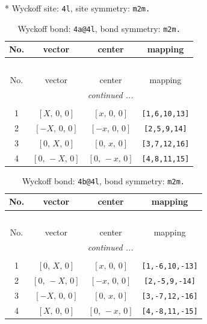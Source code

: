 \documentclass[fleqn,8pt]{jsarticle}
\begin{document}
* Wyckoff site: {\tt 4l}, site symmetry: {\tt m2m.}
\renewcommand{\arraystretch}{1.2}
\begin{longtable}{cccc}
\caption{Wyckoff bond: {\tt 4a@4l}, bond symmetry: {\tt m2m.}}
 \\
 \hline \hline
No. & vector & center & mapping \\ \hline \endfirsthead

\multicolumn{3}{l}{\tablename\ \thetable{}} \\
 \hline \hline
No. & vector & center & mapping \\ \hline \endhead

 \hline \hline
\multicolumn{3}{r}{\footnotesize\it continued ...} \\ \endfoot

 \hline \hline
\multicolumn{3}{r}{} \\ \endlastfoot

1 & $\left[ X,\, 0,\, 0 \right]$ & $\left[ x,\, 0,\, 0 \right]$ & {\tt [1,6,10,13]} \\ \hline
2 & $\left[ - X,\, 0,\, 0 \right]$ & $\left[ - x,\, 0,\, 0 \right]$ & {\tt [2,5,9,14]} \\ \hline
3 & $\left[ 0,\, X,\, 0 \right]$ & $\left[ 0,\, x,\, 0 \right]$ & {\tt [3,7,12,16]} \\ \hline
4 & $\left[ 0,\, - X,\, 0 \right]$ & $\left[ 0,\, - x,\, 0 \right]$ & {\tt [4,8,11,15]} \\
\end{longtable}
\renewcommand{\arraystretch}{1.2}
\begin{longtable}{cccc}
\caption{Wyckoff bond: {\tt 4b@4l}, bond symmetry: {\tt m2m.}}
 \\
 \hline \hline
No. & vector & center & mapping \\ \hline \endfirsthead

\multicolumn{3}{l}{\tablename\ \thetable{}} \\
 \hline \hline
No. & vector & center & mapping \\ \hline \endhead

 \hline \hline
\multicolumn{3}{r}{\footnotesize\it continued ...} \\ \endfoot

 \hline \hline
\multicolumn{3}{r}{} \\ \endlastfoot

1 & $\left[ 0,\, X,\, 0 \right]$ & $\left[ x,\, 0,\, 0 \right]$ & {\tt [1,-6,10,-13]} \\ \hline
2 & $\left[ 0,\, - X,\, 0 \right]$ & $\left[ - x,\, 0,\, 0 \right]$ & {\tt [2,-5,9,-14]} \\ \hline
3 & $\left[ - X,\, 0,\, 0 \right]$ & $\left[ 0,\, x,\, 0 \right]$ & {\tt [3,-7,12,-16]} \\ \hline
4 & $\left[ X,\, 0,\, 0 \right]$ & $\left[ 0,\, - x,\, 0 \right]$ & {\tt [4,-8,11,-15]} \\
\end{longtable}
\end{document}

